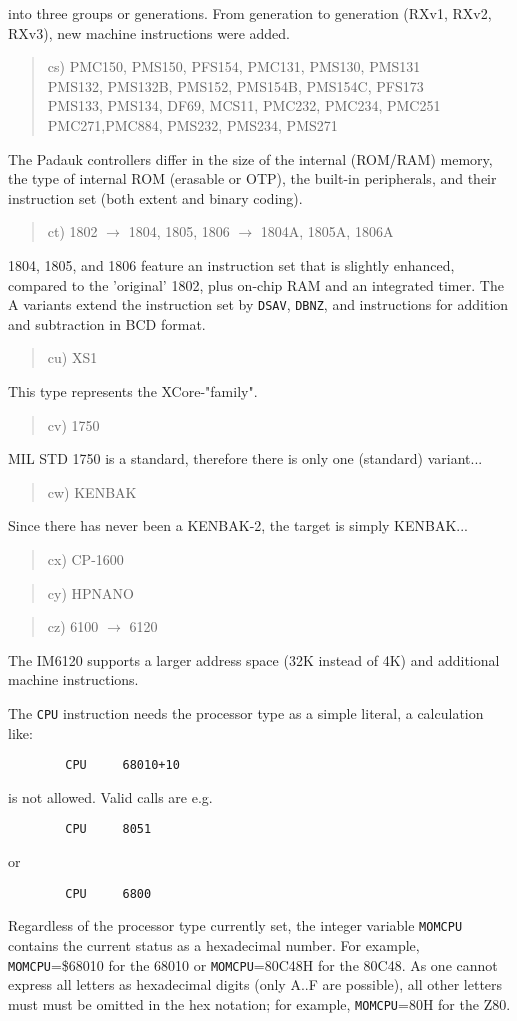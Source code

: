 \documentclass[12pt,twoside]{report}
\newcommand{\tty}[1]{{\tt #1}}
\begin{document}
into three groups or generations.  From generation to 
generation (RXv1, RXv2, RXv3), new machine instructions
were added.
\begin{quote}
cs) PMC150, PMS150, PFS154, PMC131, PMS130, PMS131 \\
    PMS132, PMS132B, PMS152, PMS154B, PMS154C, PFS173 \\
    PMS133, PMS134, DF69, MCS11, PMC232, PMC234, PMC251 \\
    PMC271,PMC884, PMS232, PMS234, PMS271
\end{quote}
The Padauk controllers differ in the size of the internal
(ROM/RAM) memory, the type of internal ROM (erasable or OTP),
the built-in peripherals, and their instruction set (both
extent and binary coding).
\begin{quote}
ct) 1802 $\rightarrow$ 1804, 1805, 1806 $\rightarrow$ 1804A,
1805A, 1806A
\end{quote}
1804, 1805, and 1806 feature an instruction set that is slightly
enhanced, compared to the 'original' 1802, plus on-chip RAM and
an integrated timer.  The A variants extend the instruction set by
\tty{DSAV}, \tty{DBNZ}, and instructions for addition and
subtraction in BCD format.
\begin{quote}
cu) XS1
\end{quote}
This type represents the XCore-"family".
\begin{quote}
cv) 1750
\end{quote}
MIL STD 1750 is a standard, therefore there is only one
(standard) variant...
\begin{quote}
cw) KENBAK
\end{quote}
Since there has never been a KENBAK-2, the target is simply KENBAK...
\begin{quote}
cx) CP-1600
\end{quote}
\begin{quote}
cy) HPNANO
\end{quote}
\begin{quote}
cz) 6100 $\rightarrow$ 6120
\end{quote}
The IM6120 supports a larger address space (32K
instead of 4K) and additional machine instructions.

The \tty{CPU} instruction needs the processor type as a simple literal, a
calculation like:
\begin{verbatim}
        CPU     68010+10
\end{verbatim}
is not allowed.  Valid calls are e.g.
\begin{verbatim}
        CPU     8051
\end{verbatim}
or
\begin{verbatim}
        CPU     6800
\end{verbatim}
Regardless of the processor type currently set, the integer variable
\tty{MOMCPU} contains the current status as a hexadecimal number.  For
example, \tty{MOMCPU}=\$68010 for the 68010 or \tty{MOMCPU}=80C48H for the
80C48.  As one cannot express all letters as hexadecimal digits (only A..F
are possible), all other letters must must be omitted in the hex notation;
for example, \tty{MOMCPU}=80H for the Z80.
\end{document}
